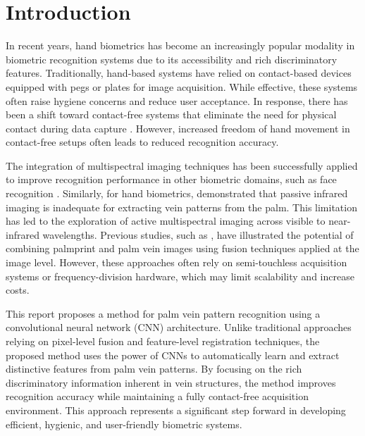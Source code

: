 \section{Introduction}

In recent years, hand biometrics has become an increasingly popular modality in biometric recognition systems due to its accessibility and rich discriminatory features. Traditionally, hand-based systems have relied on contact-based devices equipped with pegs or plates for image acquisition. While effective, these systems often raise hygiene concerns and reduce user acceptance. In response, there has been a shift toward contact-free systems that eliminate the need for physical contact during data capture \cite{xiong2005peg,jiang2007new,xiong2005model}. However, increased freedom of hand movement in contact-free setups often leads to reduced recognition accuracy. 

The integration of multispectral imaging techniques has been successfully applied to improve recognition performance in other biometric domains, such as face recognition \cite{kong2007multiscale, singh2008integrated}. Similarly, for hand biometrics, \cite{wang2006near} demonstrated that passive infrared imaging is inadequate for extracting vein patterns from the palm. This limitation has led to the exploration of active multispectral imaging across visible to near-infrared wavelengths. Previous studies, such as \cite{wang2007fusion}, have illustrated the potential of combining palmprint and palm vein images using fusion techniques applied at the image level. However, these approaches often rely on semi-touchless acquisition systems or frequency-division hardware, which may limit scalability and increase costs. 

This report proposes a method for palm vein pattern recognition using a convolutional neural network (CNN) architecture. Unlike traditional approaches relying on pixel-level fusion and feature-level registration techniques, the proposed method uses the power of CNNs to automatically learn and extract distinctive features from palm vein patterns. By focusing on the rich discriminatory information inherent in vein structures, the method improves recognition accuracy while maintaining a fully contact-free acquisition environment. This approach represents a significant step forward in developing efficient, hygienic, and user-friendly biometric systems.